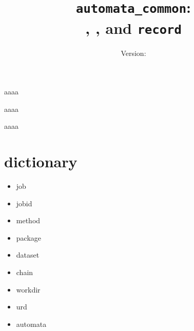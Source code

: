 \documentclass[a4paper]{report}
\title{\texttt{automata\_common}:\\ \jobtuple, \joblist, and \texttt{record}}
\author{Version: \inputfile{gitrevision}}
\date{}
\begin{document}

\begin{pythonBEG}
aaaa
\end{pythonBEG}

\begin{pythonMID}
aaaa
\end{pythonMID}

\begin{pythonEND}
aaaa
\end{pythonEND}




%

\section{dictionary}
\begin{itemize}
\item job
\item jobid
\item method
\item package
\item dataset
\item chain
\item workdir
\item urd
\item automata
\end{itemize}
\end{document}
